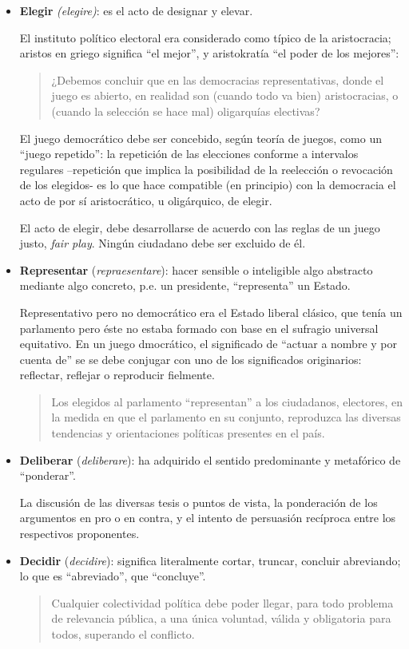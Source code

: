 \documentclass[
  letterpaper,
  DIV=11,
  numbers=noendperiod]{scrreprt}
\begin{document}
\begin{itemize}
\item
  \textbf{Elegir} \emph{(elegire)}: es el acto de designar y elevar.

  El instituto político electoral era considerado como típico de la
  aristocracia; aristos en griego significa ``el mejor'', y aristokratía
  ``el poder de los mejores'':

  \begin{quote}
  ¿Debemos concluir que en las democracias representativas, donde el
  juego es abierto, en realidad son (cuando todo va bien) aristocracias,
  o (cuando la selección se hace mal) oligarquías electivas?
  \end{quote}

  El juego democrático debe ser concebido, según teoría de juegos, como
  un ``juego repetido'': la repetición de las elecciones conforme a
  intervalos regulares --repetición que implica la posibilidad de la
  reelección o revocación de los elegidos- es lo que hace compatible (en
  principio) con la democracia el acto de por sí aristocrático, u
  oligárquico, de elegir.

  El acto de elegir, debe desarrollarse de acuerdo con las reglas de un
  juego justo, \emph{fair play}. Ningún ciudadano debe ser excluido de
  él.
\item
  \textbf{Representar} (\emph{repraesentare}): hacer sensible o
  inteligible algo abstracto mediante algo concreto, p.e. un presidente,
  ``representa'' un Estado.

  Representativo pero no democrático era el Estado liberal clásico, que
  tenía un parlamento pero éste no estaba formado con base en el
  sufragio universal equitativo. En un juego dmocrático, el significado
  de ``actuar a nombre y por cuenta de'' se se debe conjugar con uno de
  los significados originarios: reflectar, reflejar o reproducir
  fielmente.

  \begin{quote}
  Los elegidos al parlamento ``representan'' a los ciudadanos,
  electores, en la medida en que el parlamento en su conjunto,
  reproduzca las diversas tendencias y orientaciones políticas presentes
  en el país.
  \end{quote}
\item
  \textbf{Deliberar} (\emph{deliberare}): ha adquirido el sentido
  predominante y metafórico de ``ponderar''.

  La discusión de las diversas tesis o puntos de vista, la ponderación
  de los argumentos en pro o en contra, y el intento de persuasión
  recíproca entre los respectivos proponentes.
\item
  \textbf{Decidir} (\emph{decidire}): significa literalmente cortar,
  truncar, concluir abreviando; lo que es ``abreviado'', que
  ``concluye''.

  \begin{quote}
  Cualquier colectividad política debe poder llegar, para todo problema
  de relevancia pública, a una única voluntad, válida y obligatoria para
  todos, superando el conflicto.
  \end{quote}
\end{itemize}
\end{document}
